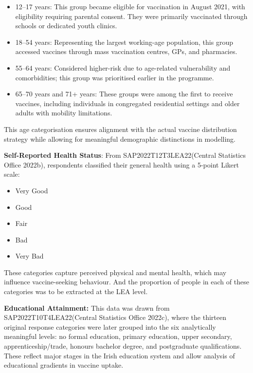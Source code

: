 \documentclass{article}
\begin{document}
\begin{itemize}
\item
  12--17 years: This group became eligible for vaccination in August
  2021, with eligibility requiring parental consent. They were primarily
  vaccinated through schools or dedicated youth clinics.
\item
  18--54 years: Representing the largest working-age population, this
  group accessed vaccines through mass vaccination centres, GPs, and
  pharmacies.
\item
  55--64 years: Considered higher-risk due to age-related vulnerability
  and comorbidities; this group was prioritised earlier in the
  programme.
\item
  65--70 years and 71+ years: These groups were among the first to
  receive vaccines, including individuals in congregated residential
  settings and older adults with mobility limitations.
\end{itemize}

This age categorisation ensures alignment with the actual vaccine
distribution strategy while allowing for meaningful demographic
distinctions in modelling.

\textbf{Self-Reported Health Status}: From SAP2022T12T3LEA22(Central
Statistics Office 2022b), respondents classified their general health
using a 5-point Likert scale:

\begin{itemize}
\item
  Very Good
\item
  Good
\item
  Fair
\item
  Bad
\item
  Very Bad
\end{itemize}

These categories capture perceived physical and mental health, which may
influence vaccine-seeking behaviour. And the proportion of people in
each of these categories was to be extracted at the LEA level.

\textbf{Educational Attainment:} This data was drawn from
SAP2022T10T4LEA22(Central Statistics Office 2022c), where the thirteen
original response categories were later grouped into the six
analytically meaningful levels: no formal education, primary education,
upper secondary, apprenticeship/trade, honours bachelor degree, and
postgraduate qualifications. These reflect major stages in the Irish
education system and allow analysis of educational gradients in vaccine
uptake.
\end{document}
